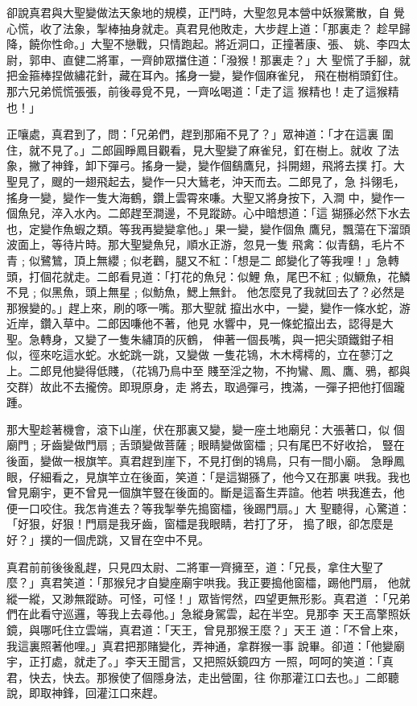 \begin{pinyinscope}
{卻說真君與大聖變做法天象地的規模，正鬥時，大聖忽見本營中妖猴驚散，自
覺心慌，收了法象，掣棒抽身就走。真君見他敗走，大步趕上道：「那裏走？
趁早歸降，饒你性命。」大聖不戀戰，只情跑起。將近洞口，正撞著康、張、
姚、李四太尉，郭申、直健二將軍，一齊帥眾擋住道：「潑猴！那裏走？」大
聖慌了手腳，就把金箍棒捏做繡花針，藏在耳內。搖身一變，變作個麻雀兒，
飛在樹梢頭釘住。那六兄弟慌慌張張，前後尋覓不見，一齊吆喝道：「走了這
猴精也！走了這猴精也！」

正嚷處，真君到了，問：「兄弟們，趕到那廂不見了？」眾神道：「才在這裏
圍住，就不見了。」二郎圓睜鳳目觀看，見大聖變了麻雀兒，釘在樹上。就收
了法象，撇了神鋒，卸下彈弓。搖身一變，變作個鷂鷹兒，抖開翅，飛將去撲
打。大聖見了，颼的一翅飛起去，變作一只大鶿老，沖天而去。二郎見了，急
抖翎毛，搖身一變，變作一隻大海鶴，鑽上雲霄來嗛。大聖又將身按下，入澗
中，變作一個魚兒，淬入水內。二郎趕至澗邊，不見蹤跡。心中暗想道：「這
猢猻必然下水去也，定變作魚蝦之類。等我再變變拿他。」果一變，變作個魚
鷹兒，飄蕩在下溜頭波面上，等待片時。那大聖變魚兒，順水正游，忽見一隻
飛禽：似青鷂，毛片不青﹔似鷺鷥，頂上無纓﹔似老鸛，腿又不紅：「想是二
郎變化了等我哩！」急轉頭，打個花就走。二郎看見道：「打花的魚兒：似鯉
魚，尾巴不紅﹔似鱖魚，花鱗不見﹔似黑魚，頭上無星﹔似魴魚，鰓上無針。
他怎麼見了我就回去了？必然是那猴變的。」趕上來，刷的啄一嘴。那大聖就
攛出水中，一變，變作一條水蛇，游近岸，鑽入草中。二郎因嗛他不著，他見
水響中，見一條蛇攛出去，認得是大聖。急轉身，又變了一隻朱繡頂的灰鶴，
伸著一個長嘴，與一把尖頭鐵鉗子相似，徑來吃這水蛇。水蛇跳一跳，又變做
一隻花鴇，木木樗樗的，立在蓼汀之上。二郎見他變得低賤，（花鴇乃鳥中至
賤至淫之物，不拘鸞、鳳、鷹、鴉，都與交群）故此不去攏傍。即現原身，走
將去，取過彈弓，拽滿，一彈子把他打個躘踵。

那大聖趁著機會，滾下山崖，伏在那裏又變，變一座土地廟兒：大張著口，似
個廟門﹔牙齒變做門扇﹔舌頭變做菩薩﹔眼睛變做窗櫺﹔只有尾巴不好收拾，
豎在後面，變做一根旗竿。真君趕到崖下，不見打倒的鴇鳥，只有一間小廟。
急睜鳳眼，仔細看之，見旗竿立在後面，笑道：「是這猢猻了，他今又在那裏
哄我。我也曾見廟宇，更不曾見一個旗竿豎在後面的。斷是這畜生弄諠。他若
哄我進去，他便一口咬住。我怎肯進去？等我掣拳先搗窗櫺，後踢門扇。」大
聖聽得，心驚道：「好狠，好狠！門扇是我牙齒，窗櫺是我眼睛，若打了牙，
搗了眼，卻怎麼是好？」撲的一個虎跳，又冒在空中不見。

真君前前後後亂趕，只見四太尉、二將軍一齊擁至，道：「兄長，拿住大聖了
麼？」真君笑道：「那猴兒才自變座廟宇哄我。我正要搗他窗櫺，踢他門扇，
他就縱一縱，又渺無蹤跡。可怪，可怪！」眾皆愕然，四望更無形影。真君道
：「兄弟們在此看守巡邏，等我上去尋他。」急縱身駕雲，起在半空。見那李
天王高擎照妖鏡，與哪吒住立雲端，真君道：「天王，曾見那猴王麼？」天王
道：「不曾上來，我這裏照著他哩。」真君把那賭變化，弄神通，拿群猴一事
說畢。卻道：「他變廟宇，正打處，就走了。」李天王聞言，又把照妖鏡四方
一照，呵呵的笑道：「真君，快去，快去。那猴使了個隱身法，走出營圍，往
你那灌江口去也。」二郎聽說，即取神鋒，回灌江口來趕。

}
\end{pinyinscope}
